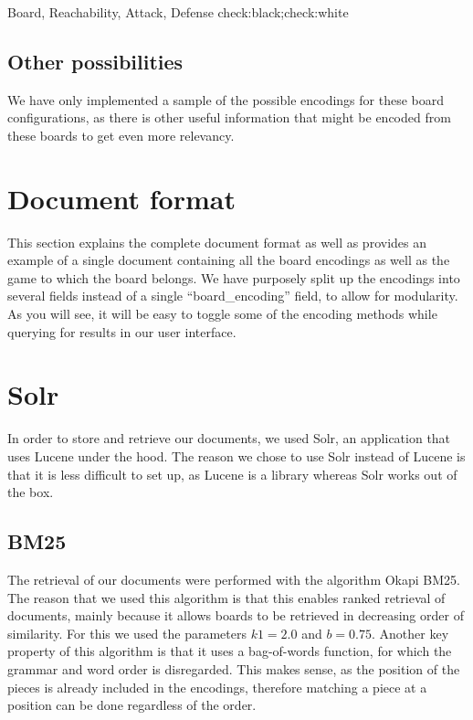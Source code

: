 \documentclass[11pt]{article}
\begin{document}
    Board, Reachability, Attack, Defense
    check:black;check:white

    \subsection{Other possibilities}

    We have only implemented a sample of the possible encodings for these board configurations, as there is other useful information that might be encoded from these boards to get even more relevancy.



    \section{Document format}\label{sec:documentformat}


    This section explains the complete document format as well as provides an example of a single document containing all the board encodings as well as the game to which the board belongs. We have purposely split up the encodings into several fields instead of a single ``board\_encoding'' field, to allow for modularity. As you will see, it will be easy to toggle some of the encoding methods while querying for results in our user interface.

    \section{Solr}

    In order to store and retrieve our documents, we used Solr, an application that uses Lucene under the hood. The reason we chose to use Solr instead of Lucene is that it is less difficult to set up, as Lucene is a library whereas Solr works out of the box.

    \subsection{BM25}

    The retrieval of our documents were performed with the algorithm Okapi BM25. The reason that we used this algorithm is that this enables ranked retrieval of documents, mainly because it allows boards to be retrieved in decreasing order of similarity. For this we used the parameters $k1 = 2.0$ and $b = 0.75$. Another key property of this algorithm is that it uses a bag-of-words function, for which the grammar and word order is disregarded. This makes sense, as the position of the pieces is already included in the encodings, therefore matching a piece at a position can be done regardless of the order.
\end{document}
